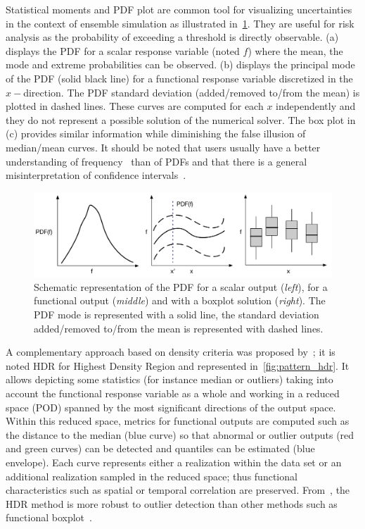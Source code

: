 Statistical moments and PDF plot are common tool for visualizing uncertainties in the context of ensemble simulation as illustrated in~\cref{fig:pattern_pdf}. They are useful for risk analysis as the probability of exceeding a threshold is directly observable. (a) displays the PDF for a scalar response variable (noted $f$) where the mean, the mode and extreme probabilities can be observed. (b) displays the principal mode of the PDF (solid black line) for a functional response variable discretized in the $x-$direction. The PDF standard deviation (added/removed to/from the mean) is plotted in dashed lines. These curves are computed for each $x$ independently and they do not represent a possible solution of the numerical solver. The box plot in (c) provides similar information while diminishing the false illusion of median/mean curves. It should be noted that users usually have a better understanding of frequency~\citep{Gigerenzer1995} than of PDFs and that there is a  general misinterpretation of confidence intervals~\citep{Belia2005}.
\begin{figure}[!ht]
\centering
\includegraphics[width=\linewidth,keepaspectratio]{fig/literature/patterns_pdf.pdf}
\caption{Schematic representation of the PDF for a scalar output (\emph{left}), for a functional output (\emph{middle}) and with a boxplot solution (\emph{right}). The PDF mode is represented with a solid line, the standard deviation added/removed to/from the mean is represented with dashed lines.}
\label{fig:pattern_pdf}
\end{figure}

A complementary approach based on density criteria was proposed by~\citep{Hyndman2009,Sun2011}; it is noted HDR for Highest Density Region and represented in~\cref{fig:pattern_hdr}. It allows depicting some statistics (for instance median or outliers) taking into account the functional response variable as a whole and working in a reduced space (POD) spanned by the most significant directions of the output space. Within this reduced space, metrics for functional outputs are computed such as the distance to the median (blue curve) so that abnormal or outlier outputs (red and green curves) can be detected and quantiles can be estimated (blue envelope). Each curve represents either a realization within the data set or an additional realization sampled in the reduced space; thus functional characteristics such as spatial or temporal correlation are preserved.  From~\citep{Popelin2013,Ribes2015}, the HDR method is more robust to outlier detection than other methods such as functional boxplot~\citep{Sun2011,Whitaker2013}.

